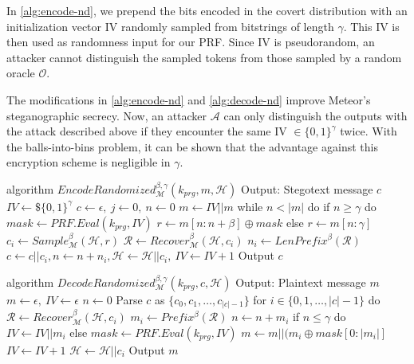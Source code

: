In \autoref{alg:encode-nd}, we prepend the bits encoded in the covert distribution with an initialization vector IV randomly sampled from bitstrings of length $\gamma$.
This IV is then used as randomness input for our PRF.
Since IV is pseudorandom, an attacker cannot distinguish the sampled tokens from those sampled by a random oracle $\mathcal{O}$.

The modifications in \autoref{alg:encode-nd} and \autoref{alg:decode-nd} improve Meteor's steganographic secrecy.
Now, an attacker $\mathcal{A}$ can only distinguish the outputs with the attack described above if they encounter the same IV $\in \{ 0,1\}^\gamma$ twice.
With the balls-into-bins problem, it can be shown that the advantage against this encryption scheme is negligible in $\gamma$.
\begin{Pseudocode}[float, caption={
Meteor EncodeRandomized Algorithm.
This algorithm differs from the original Encode algorithm by sampling a random IV before encoding.
That IV is later used as randomness in a PRF used to generated the random masked.
The IV is incremented after each iteration of the encoding process.
The first $\gamma$ bits of the hiddentext are the IV. 
The introduction of an IV does not negatively affect secrecy, since IV is indistinguishable from randomness.}, label={alg:encode-nd}]
algorithm $EncodeRandomized_{\mathcal{M}}^{\beta,\gamma}(k_{prg}, m, \mathcal{H})$
	Output: Stegotext message $c$
	$IV \leftarrow\$ \{0,1\}^\gamma$
	$c \leftarrow \epsilon,~ j \leftarrow 0,~ n \leftarrow 0$
	$m \leftarrow IV || m$
	while $n < |m|$ do
		if $n \geq \gamma$ do
			$mask \leftarrow PRF.Eval(k_{prg}, IV)$
			$r \leftarrow m[n:n+\beta] \oplus mask$
		else
			$r \leftarrow m[n:\gamma]$
		$c_i \leftarrow Sample_{\mathcal{M}}^\beta(\mathcal{H}, r)$
		$\mathcal{R} \leftarrow Recover_{\mathcal{M}}^\beta(\mathcal{H}, c_i)$
		$n_i \leftarrow LenPrefix^\beta(\mathcal{R})$
		$c \leftarrow c || c_i, n \leftarrow n+n_i, \mathcal{H} \leftarrow \mathcal{H}||c_i,~ IV \leftarrow IV+1$
	Output $c$
\end{Pseudocode}
\begin{Pseudocode}[float, caption={
Meteor DecodeRandomized Algorithm.
This algorithm differs from the original Decode algorithm by interpreting the first $\gamma$ bits of the hiddentext as IV.
After decoding $\gamma$ bits of hiddentext, a PRF is initialized with IV for generation of pseudorandom masks.}, label={alg:decode-nd}]
algorithm $DecodeRandomized_{\mathcal{M}}^{\beta,\gamma}(k_{prg}, c, \mathcal{H})$
	Output: Plaintext message $m$
	$m \leftarrow \epsilon,~ IV \leftarrow \epsilon$
	$n \leftarrow 0$
	Parse $c$ as $\{ c_0, c_1, \dots, c_{|c|-1} \}$
	for $i \in \{0, 1, \dots, |c|-1 \}$ do
		$\mathcal{R} \leftarrow Recover_{\mathcal{M}}^\beta(\mathcal{H}, c_i)$
		$m_i \leftarrow Prefix^\beta(\mathcal{R})$
		$n \leftarrow n + m_i$
		if $n \leq \gamma$ do
			$IV \leftarrow IV || m_i$
		else
			$mask \leftarrow PRF.Eval(k_{prg}, IV)$
			$m \leftarrow m || (m_i \oplus mask[0: |m_i|]$
			$IV \leftarrow IV + 1$
		$\mathcal{H} \leftarrow \mathcal{H}||c_i$
	Output $m$
\end{Pseudocode}